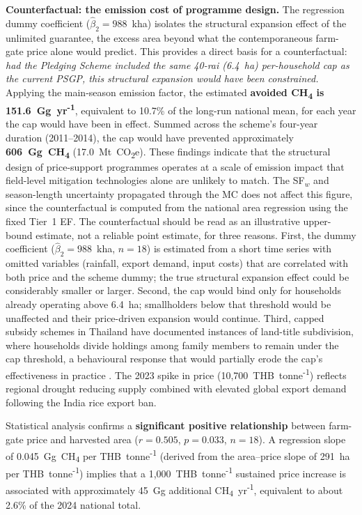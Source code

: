 \documentclass[fleqn,10pt]{olplainarticle}
\begin{document}
\textbf{Counterfactual: the emission cost of programme design.}
The regression dummy coefficient ($\hat{\beta}_2 = 988$~kha) isolates the
structural expansion effect of the unlimited guarantee, the excess area beyond
what the contemporaneous farm-gate price alone would predict.
This provides a direct basis for a counterfactual: \textit{had the Pledging
Scheme included the same 40-rai (6.4~ha) per-household cap as the current PSGP,
this structural expansion would have been constrained.}
Applying the main-season emission factor, the estimated \textbf{avoided
CH\textsubscript{4} is 151.6~Gg~yr\textsuperscript{-1}}, equivalent to 10.7\%
of the long-run national mean, for each year the cap would have been in effect.
Summed across the scheme's four-year duration (2011--2014), the cap would have
prevented approximately \textbf{606~Gg~CH\textsubscript{4}} (17.0~Mt~CO\textsubscript{2}e).
These findings indicate that the structural design of price-support programmes
operates at a scale of emission impact that field-level mitigation technologies
alone are unlikely to match.
The SF$_w$ and season-length uncertainty propagated through the MC does not affect
this figure, since the counterfactual is computed from the national area regression
using the fixed Tier~1 EF.
The counterfactual should be read as an illustrative upper-bound estimate, not
a reliable point estimate, for three reasons.
First, the dummy coefficient ($\hat{\beta}_2 = 988$~kha, $n = 18$) is estimated
from a short time series with omitted variables (rainfall, export demand, input
costs) that are correlated with both price and the scheme dummy; the true
structural expansion effect could be considerably smaller or larger.
Second, the cap would bind only for households already operating above 6.4~ha;
smallholders below that threshold would be unaffected and their price-driven
expansion would continue.
Third, capped subsidy schemes in Thailand have documented instances of
land-title subdivision, where households divide holdings among family members
to remain under the cap threshold, a behavioural response that would partially
erode the cap's effectiveness in practice \citep{poapongsakorn2014}.
The 2023 spike in price (10,700~THB~tonne\textsuperscript{-1}) reflects
regional drought reducing supply combined with elevated
global export demand following the India rice export ban.

Statistical analysis confirms a \textbf{significant positive relationship}
between farm-gate price and harvested area ($r = 0.505$, $p = 0.033$, $n = 18$).
A regression slope of 0.045~Gg~CH\textsubscript{4} per THB~tonne\textsuperscript{-1}
(derived from the area--price slope of 291~ha per THB~tonne\textsuperscript{-1})
implies that a 1,000~THB~tonne\textsuperscript{-1} sustained price increase
is associated with approximately 45~Gg additional CH\textsubscript{4}~yr\textsuperscript{-1},
equivalent to about 2.6\% of the 2024 national total.
\end{document}
